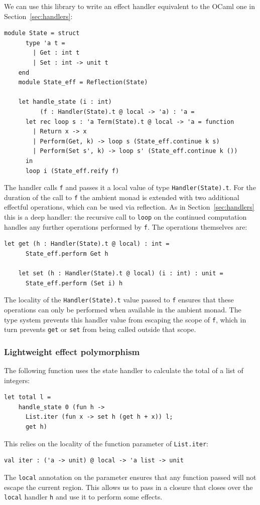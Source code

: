 \documentclass[acmsmall, screen, review, anonymous]{acmart}
\theoremstyle{definition}
\begin{document}
We can use this library to write an effect handler equivalent to the
OCaml one in Section~\ref{sec:handlers}:
\begin{lstlisting}[style=oxcaml]
    module State = struct
      type 'a t =
        | Get : int t
        | Set : int -> unit t
    end
    module State_eff = Reflection(State)

    let handle_state (i : int)
          (f : Handler(State).t @ local -> 'a) : 'a =
      let rec loop s : 'a Term(State).t @ local -> 'a = function
        | Return x -> x
        | Perform(Get, k) -> loop s (State_eff.continue k s)
        | Perform(Set s', k) -> loop s' (State_eff.continue k ())
      in
      loop i (State_eff.reify f)
\end{lstlisting}
The handler calls \lstinline[style=oxcaml]{f} and passes it a local value of
type \lstinline[style=oxcaml]{Handler(State).t}. For the duration of the
call to \lstinline[style=oxcaml]{f} the ambient monad is extended with
two additional effectful operations, which can be used via reflection.
As in Section~\ref{sec:handlers} this is a deep handler: the recursive
call to \lstinline[style=oxcaml]{loop} on the continued computation
handles any further operations performed by
\lstinline[style=oxcaml]{f}. The operations themselves are:
\begin{lstlisting}[style=oxcaml]
    let get (h : Handler(State).t @ local) : int =
      State_eff.perform Get h

    let set (h : Handler(State).t @ local) (i : int) : unit =
      State_eff.perform (Set i) h
\end{lstlisting}

The locality of the \lstinline[style=oxcaml]{Handler(State).t} value
passed to \lstinline[style=oxcaml]{f} ensures that these operations can
only be performed when available in the ambient monad. The type system
prevents this handler value from escaping the scope of
\lstinline[style=oxcaml]{f}, which in turn prevents
\lstinline[style=oxcaml]{get} or \lstinline[style=oxcaml]{set} from
being called outside that scope.

\subsubsection{Lightweight effect polymorphism}

The following function uses the state handler to calculate the total of
a list of integers:
\begin{lstlisting}[style=oxcaml]
  let total l =
    handle_state 0 (fun h ->
      List.iter (fun x -> set h (get h + x)) l;
      get h)
\end{lstlisting}
This relies on the locality of the function parameter of
\lstinline[style=oxcaml]{List.iter}:
\begin{lstlisting}[style=oxcaml]
  val iter : ('a -> unit) @ local -> 'a list -> unit
\end{lstlisting}
The \lstinline[style=oxcaml]{local} annotation on the parameter ensures
that any function passed will not escape the current region. This allows
us to pass in a closure that closes over the
\lstinline[style=oxcaml]{local} handler \lstinline[style=oxcaml]{h} and
use it to perform some effects.
\end{document}
